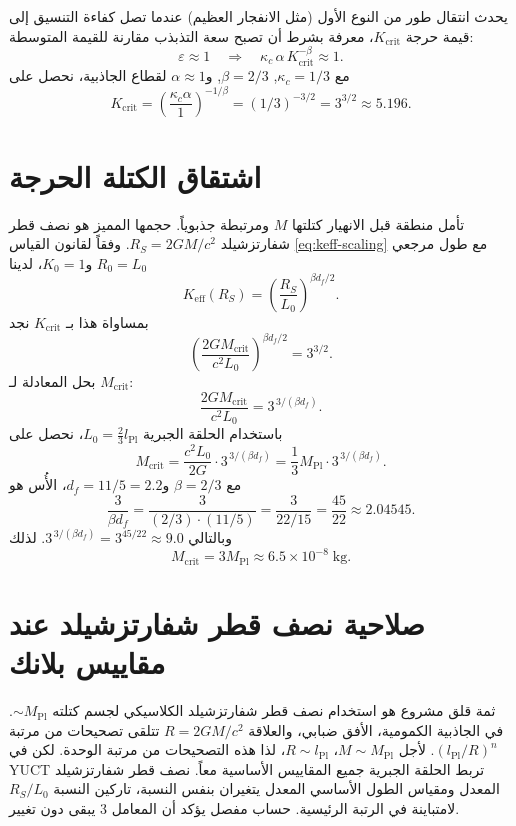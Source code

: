 \documentclass[12pt,a4paper]{article}
\newcommand{\kappac}{\kappa_c}
\newcommand{\Keff}{K_{\mathrm{eff}}}
\newcommand{\betaf}{\beta}
\newcommand{\Lpl}{l_{\mathrm{Pl}}}
\newcommand{\Lzero}{L_0}
\begin{document}
	يحدث انتقال طور من النوع الأول (مثل الانفجار العظيم) عندما تصل كفاءة التنسيق إلى قيمة حرجة \(K_{\mathrm{crit}}\)، معرفة بشرط أن تصبح سعة التذبذب مقارنة للقيمة المتوسطة:
	\begin{equation}
		\varepsilon \approx 1 \quad \Longrightarrow \quad \kappac \, \alpha \, K_{\mathrm{crit}}^{-\betaf} \approx 1.
		\label{eq:critical-condition}
	\end{equation}
	مع \(\kappac = 1/3\), \(\betaf = 2/3\), و\(\alpha \approx 1\) لقطاع الجاذبية، نحصل على
	\begin{equation}
		K_{\mathrm{crit}} = \left( \frac{\kappac \alpha}{1} \right)^{-1/\betaf} = (1/3)^{-3/2} = 3^{3/2} \approx 5.196.
		\label{eq:Kcrit}
	\end{equation}
	
	\section{اشتقاق الكتلة الحرجة}
	\label{sec:derivation}
	
	تأمل منطقة قبل الانهيار كتلتها \(M\) ومرتبطة جذبوياً. حجمها المميز هو نصف قطر شفارتزشيلد \(R_S = 2GM/c^2\). وفقاً لقانون القياس \eqref{eq:keff-scaling} مع طول مرجعي \(R_0 = \Lzero\) و\(K_0 = 1\)، لدينا
	\[
	\Keff(R_S) = \left( \frac{R_S}{\Lzero} \right)^{\betaf d_f / 2}.
	\]
	بمساواة هذا بـ \(K_{\mathrm{crit}}\) نجد
	\[
	\left( \frac{2GM_{\mathrm{crit}}}{c^2 \Lzero} \right)^{\betaf d_f / 2} = 3^{3/2}.
	\]
	بحل المعادلة لـ \(M_{\mathrm{crit}}\):
	\[
	\frac{2GM_{\mathrm{crit}}}{c^2 \Lzero} = 3^{\,3/(\betaf d_f)}.
	\]
	باستخدام الحلقة الجبرية \(\Lzero = \frac{2}{3} \Lpl\)، نحصل على
	\[
	M_{\mathrm{crit}} = \frac{c^2 \Lzero}{2G} \cdot 3^{\,3/(\betaf d_f)} = \frac{1}{3} M_{\mathrm{Pl}} \cdot 3^{\,3/(\betaf d_f)}.
	\]
	مع \(\betaf = 2/3\) و\(d_f = 11/5 = 2.2\)، الأُس هو
	\[
	\frac{3}{\betaf d_f} = \frac{3}{(2/3) \cdot (11/5)} = \frac{3}{22/15} = \frac{45}{22} \approx 2.04545.
	\]
	وبالتالي \(3^{\,3/(\betaf d_f)} = 3^{45/22} \approx 9.0\). لذلك
	\[
	M_{\mathrm{crit}} = 3 M_{\mathrm{Pl}} \approx 6.5 \times 10^{-8}\;\text{kg}.
	\]
	
	\section{صلاحية نصف قطر شفارتزشيلد عند مقاييس بلانك}
	
	ثمة قلق مشروع هو استخدام نصف قطر شفارتزشيلد الكلاسيكي لجسم كتلته \(\sim M_{\mathrm{Pl}}\). في الجاذبية الكمومية، الأفق ضبابي، والعلاقة \(R = 2GM/c^2\) تتلقى تصحيحات من مرتبة \((\Lpl/R)^n\). لأجل \(M \sim M_{\mathrm{Pl}}\)، \(R \sim \Lpl\)، لذا هذه التصحيحات من مرتبة الوحدة. لكن في YUCT تربط الحلقة الجبرية جميع المقاييس الأساسية معاً. نصف قطر شفارتزشيلد المعدل ومقياس الطول الأساسي المعدل يتغيران بنفس النسبة، تاركين النسبة \(R_S / \Lzero\) لامتباينة في الرتبة الرئيسية. حساب مفصل يؤكد أن المعامل 3 يبقى دون تغيير.
	
\end{document}

